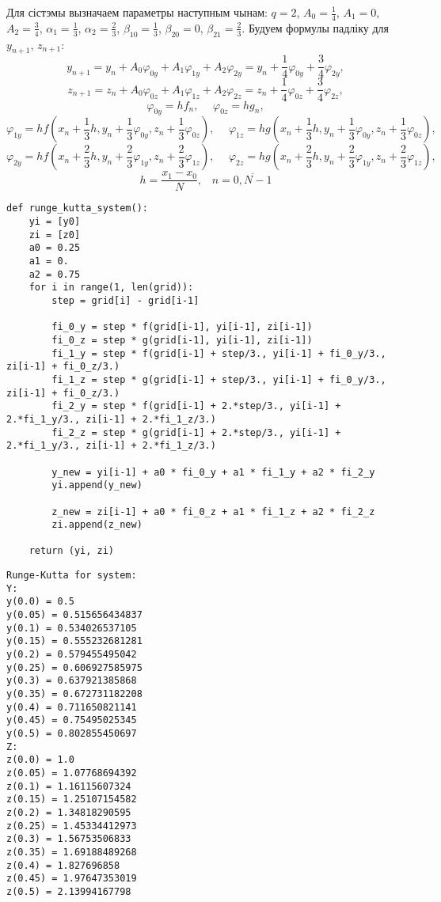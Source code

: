 Для сістэмы вызначаем параметры наступным чынам: $q=2$, $A_0 = \frac{1}{4}$, $A_1 = 0$, $A_2 = \frac{3}{4}$, $\alpha _1 = \frac{1}{3}$, $\alpha _2 = \frac{2}{3}$, $\beta _{10} = \frac{1}{3}$, $\beta _{20} = 0$, $\beta _{21} = \frac{2}{3}$. Будуем формулы падліку для $y_{n+1}$, $z_{n+1}$:\\
\[ y_{n+1} = y_n + A_0 \varphi _{0y} + A_1 \varphi _{1y} + A_2 \varphi _{2y} = y_n + \frac{1}{4}\varphi_{0y} + \frac{3}{4}\varphi_{2y},\]
\[ z_{n+1} = z_n + A_0 \varphi _{0z} + A_1 \varphi _{1z} + A_2 \varphi _{2z} = z_n + \frac{1}{4}\varphi_{0z} + \frac{3}{4}\varphi_{2z},\]
\[ \varphi_{0y} = hf_n, \hspace{15pt} \varphi _{0z} = hg_n, \]
\[ \varphi_{1y} = hf(x_n + \frac{1}{3}h, y_n + \frac{1}{3} \varphi_{0y}, z_n + \frac{1}{3} \varphi_{0z}), \hspace{15pt} \varphi_{1z} = hg(x_n + \frac{1}{3}h, y_n + \frac{1}{3} \varphi_{0y}, z_n + \frac{1}{3} \varphi_{0z}), \]
\[ \varphi_{2y} = hf(x_n + \frac{2}{3}h, y_n + \frac{2}{3} \varphi_{1y}, z_n + \frac{2}{3} \varphi_{1z}), \hspace{15pt} \varphi_{2z} = hg(x_n + \frac{2}{3}h, y_n + \frac{2}{3} \varphi_{1y}, z_n + \frac{2}{3} \varphi_{1z}), \]
\[ h = \frac{x_1-x_0}{N}, \hspace{10pt} n = \overline{0, N-1} \]

{\small
\begin{verbatim}
def runge_kutta_system():
    yi = [y0]
    zi = [z0]
    a0 = 0.25
    a1 = 0.
    a2 = 0.75
    for i in range(1, len(grid)):
        step = grid[i] - grid[i-1]

        fi_0_y = step * f(grid[i-1], yi[i-1], zi[i-1])
        fi_0_z = step * g(grid[i-1], yi[i-1], zi[i-1])
        fi_1_y = step * f(grid[i-1] + step/3., yi[i-1] + fi_0_y/3., zi[i-1] + fi_0_z/3.)
        fi_1_z = step * g(grid[i-1] + step/3., yi[i-1] + fi_0_y/3., zi[i-1] + fi_0_z/3.)
        fi_2_y = step * f(grid[i-1] + 2.*step/3., yi[i-1] + 2.*fi_1_y/3., zi[i-1] + 2.*fi_1_z/3.)
        fi_2_z = step * g(grid[i-1] + 2.*step/3., yi[i-1] + 2.*fi_1_y/3., zi[i-1] + 2.*fi_1_z/3.)

        y_new = yi[i-1] + a0 * fi_0_y + a1 * fi_1_y + a2 * fi_2_y
        yi.append(y_new)

        z_new = zi[i-1] + a0 * fi_0_z + a1 * fi_1_z + a2 * fi_2_z
        zi.append(z_new)

    return (yi, zi)
\end{verbatim}
}

{\small
\begin{verbatim}
Runge-Kutta for system:
Y:
y(0.0) = 0.5
y(0.05) = 0.515656434837
y(0.1) = 0.534026537105
y(0.15) = 0.555232681281
y(0.2) = 0.579455495042
y(0.25) = 0.606927585975
y(0.3) = 0.637921385868
y(0.35) = 0.672731182208
y(0.4) = 0.711650821141
y(0.45) = 0.75495025345
y(0.5) = 0.802855450697
Z:
z(0.0) = 1.0
z(0.05) = 1.07768694392
z(0.1) = 1.16115607324
z(0.15) = 1.25107154582
z(0.2) = 1.34818290595
z(0.25) = 1.45334412973
z(0.3) = 1.56753506833
z(0.35) = 1.69188489268
z(0.4) = 1.827696858
z(0.45) = 1.97647353019
z(0.5) = 2.13994167798
\end{verbatim}
}
